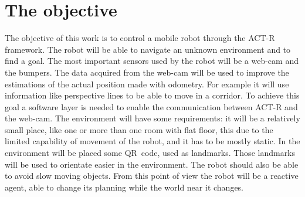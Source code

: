 \section{The objective}
The objective of this work is to control a mobile robot through the \mbox{ACT-R} framework. The robot will be able to navigate an unknown environment and to find a goal. The most important sensors used by the robot will be a \mbox{web-cam} and the bumpers. The data acquired from the \mbox{web-cam} will be used to improve the estimations of the actual position made with odometry. For example it will use information like perspective lines to be able to move in a corridor.
To achieve this goal a software layer is needed to enable the communication between ACT-R and the \mbox{web-cam}. The environment will have some requirements: it will be a relatively small place, like one or more than one room with flat floor, this due to the limited capability of movement of the robot, and it has to be mostly static. In the environment will be placed some \mbox{QR code}, used as landmarks. Those landmarks will be used to orientate easier in the environment.
The robot should also be able to avoid slow moving objects. From this point of view the robot will be a reactive agent, able to change its planning while the world near it changes. 







